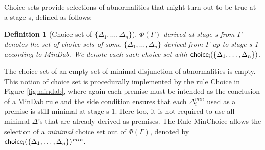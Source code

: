 \documentclass[]{article}
\newtheorem{definition}{Definition}
\begin{document}
Choice sets provide selections of abnormalities that might turn out to be true at a stage {\sf s}, defined as follows:

\begin{definition}[Choice set of $\{\Delta_{1}, \dots, \Delta_{n}\}$]
$\Phi(\Gamma)$ derived at stage {\sf s} from $\Gamma$ denotes the set of choice sets of some $\{\Delta_{1}, \dots, \Delta_{n}\}$ derived from $\Gamma$ up to stage {\sf s-1} according to {\sf MinDab}. We denote each such choice set with ${\sf choice_{i}}(\{\Delta_{1}, \dots, \Delta_{n}\})$.
\end{definition}

The choice set of an empty set of minimal disjunction of abnormalities is empty. This notion of choice set is procedurally implemented by the rule {\sf Choice} in Figure \ref{fig:mindab}, where again each premise must be intended as the conclusion of a {\sf MinDab} rule and the side condition ensures that each $\Delta_{i}^{min}$ used as a premise is still minimal at stage {\sf s-1}. Here too, it is not required to use all minimal $\Delta$'s that are already derived as premises. The Rule {\sf MinChoice} allows the selection of a \textit{minimal} choice set out of $\Phi(\Gamma)$, denoted by ${\sf choice_{i}}(\{\Delta_{1},\ldots, \Delta_{n}\})^{min}$.
\end{document}

